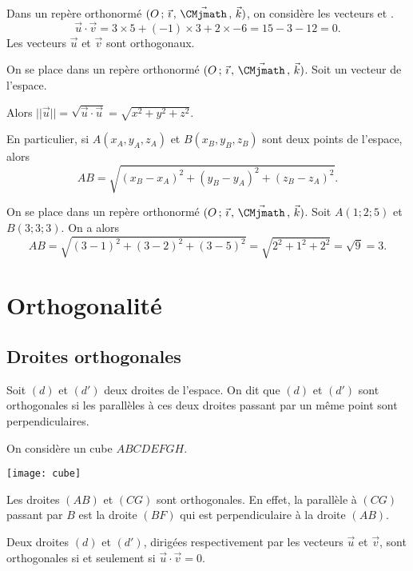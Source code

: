 \documentclass[11pt,fleqn, openany]{book} %
\begin{document}
\begin{example} Dans un repère orthonormé $\Oijk$, on considère les vecteurs \renewcommand{\arraystretch}{1} et \renewcommand{\arraystretch}{1}.
\[ \vec u \cdot \vec v = 3 \times 5 + (-1) \times 3 + 2 \times -6 = 15 -3 -12=0.\]
Les vecteurs $\vec u$ et $\vec v$ sont orthogonaux.\end{example}

\begin{proposition} On se place dans un repère orthonormé $\Oijk$. Soit \renewcommand{\arraystretch}{1} un vecteur de l'espace. 

Alors $ \lvert\lvert\vec u\rvert\rvert = \sqrt{ \vec u \cdot \vec u} =  \sqrt{x^2+y^2+z^2}$.

En particulier, si $A(x_A,y_A,z_A)$ et $B(x_B, y_B, z_B)$ sont deux points de l'espace, alors
\[ AB = \sqrt{(x_B-x_A)^2+(y_B-y_A)^2+(z_B-z_A)^2} .\]\end{proposition}

\begin{example} On se place dans un repère orthonormé $\Oijk$. Soit $A(1;2;5)$ et $B(3;3;3)$. On a alors
\[ AB = \sqrt{(3-1)^2+(3-2)^2+(3-5)^2}=\sqrt{2^2+1^2+2^2}=\sqrt{9}=3.\]\end{example}



\section{Orthogonalité}

\subsection{Droites orthogonales}

\begin{definition}Soit $(d)$ et $(d')$ deux droites de l'espace. On dit que $(d)$ et $(d')$ sont orthogonales si les parallèles à ces deux droites passant par un même point sont perpendiculaires.\end{definition}

\begin{example} On considère un cube $ABCDEFGH$.

\begin{center}
\texttt{[image: cube]}
\end{center}

Les droites $(AB)$ et $(CG)$ sont orthogonales. En effet, la parallèle à $(CG)$ passant par $B$ est la droite $(BF)$ qui est perpendiculaire à la droite $(AB)$.\end{example}
\newpage
\begin{proposition}Deux droites $(d)$ et $(d')$, dirigées respectivement par les vecteurs $\vec u$ et $\vec v$, sont orthogonales si et seulement si $\vec u \cdot \vec v = 0$.\end{proposition}
\end{document}
